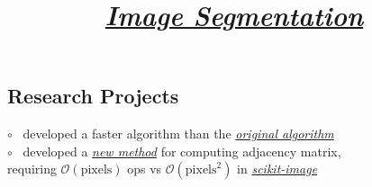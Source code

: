 \documentclass[12pt,margintitle,line]{res}
\begin{document}
\begin{resume}


\vspace{0.15cm}

\section{Research Projects}

\vspace{-0.5cm}
\title{
\href{https://github.com/Will-Wright/image-segmentation} {\textsl{Image Segmentation}}
}
\employer{ 
}
\dates{}
\begin{position}

	\begin{figure} 
		\vspace{-0.90cm}
		\hspace{-1.95cm}
 	 	\begin{minipage}[t]{3cm}
  		\end{minipage} 
	\end{figure} 
	
\vspace{-1.25cm}
$\circ$ \ developed a faster algorithm than the 
\href{http://www1.maths.lth.se/matematiklth/vision/publdb/reports/pdf/eriksson-olsson-etal-jmiv-10.pdf} {\textsl{original algorithm}}
	\\
$\circ$ \ developed a
\href{https://github.com/Will-Wright/image-segmentation/blob/master/src/GetAdjMat.py}{\textit{new method}} 
for computing adjacency matrix,
	\\		\hspace*{0.35cm} 
requiring $\mathcal{O}(\text{pixels})$ ops vs $\mathcal{O}(\text{pixels}^2)$ in
\href{https://github.com/scikit-image/scikit-image/blob/master/skimage/future/graph/rag.py}{\textit{scikit-image}} 
\end{position}





\end{resume}
\end{document}
